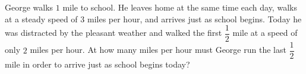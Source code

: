George walks $1$ mile to school. He leaves home at the same time each day, walks at a steady speed of $3$ miles per hour, and arrives just as school begins. Today he was distracted by the pleasant weather and walked the first $\dfrac12$ mile at a speed of only $2$ miles per hour. At how many miles per hour must George run the last $\dfrac12$ mile in order to arrive just as school begins today?
